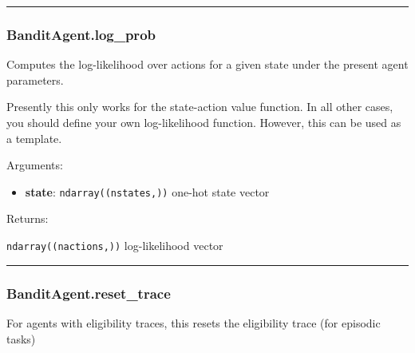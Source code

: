 \begin{center}\rule{0.5\linewidth}{\linethickness}\end{center}

\hypertarget{banditagent.log_prob}{%
\subsubsection{BanditAgent.log\_prob}\label{banditagent.log_prob}}

\begin{Shaded}
\begin{Highlighting}[]
\end{Highlighting}
\end{Shaded}

Computes the log-likelihood over actions for a given state under the
present agent parameters.

Presently this only works for the state-action value function. In all
other cases, you should define your own log-likelihood function.
However, this can be used as a template.

Arguments:

\begin{itemize}
\tightlist
\item
  \textbf{state}: \texttt{ndarray((nstates,))} one-hot state vector
\end{itemize}

Returns:

\texttt{ndarray((nactions,))} log-likelihood vector

\begin{center}\rule{0.5\linewidth}{\linethickness}\end{center}

\hypertarget{banditagent.reset_trace}{%
\subsubsection{BanditAgent.reset\_trace}\label{banditagent.reset_trace}}

\begin{Shaded}
\begin{Highlighting}[]
\OperatorTok{=}\NormalTok{)}
\end{Highlighting}
\end{Shaded}

For agents with eligibility traces, this resets the eligibility trace
(for episodic tasks)

